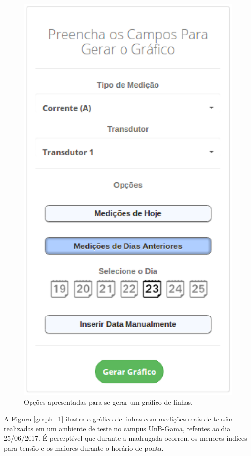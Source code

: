 \begin{figure}[!h]
    \centering
    \includegraphics[keepaspectratio=true, scale=0.5]{figuras/graph_options.eps}
    \caption{Opções apresentadas para se gerar um gráfico de linhas.}
    \label{graph_options}
\end{figure}

A Figura \ref{graph_1} ilustra o gráfico de linhas com medições reais de tensão realizadas em um ambiente de teste no campus UnB-Gama, refentes ao dia 25/06/2017. É perceptível que durante a madrugada ocorrem os menores índices para tensão e os maiores durante o horário de ponta.

